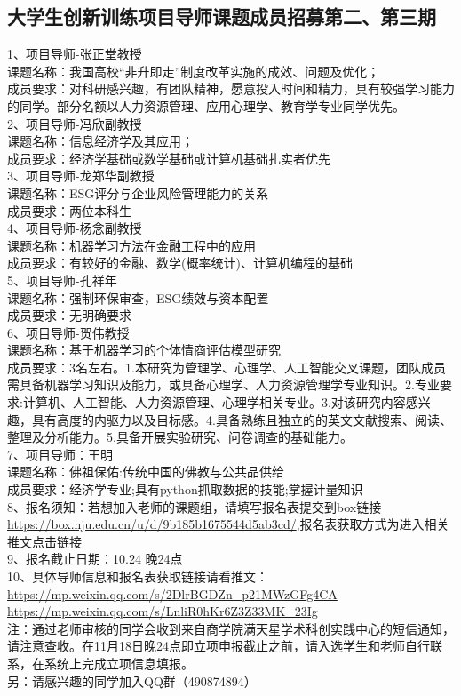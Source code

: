 \documentclass[letterpaper, 12pt]{article}
\begin{document}
\begin{multicols}{2}
\section{大学生创新训练项目导师课题成员招募第二、第三期}
1、项目导师-张正堂教授\\
   课题名称：我国高校“非升即走”制度改革实施的成效、问题及优化；\\
   成员要求：对科研感兴趣，有团队精神，愿意投入时间和精力，具有较强学习能力的同学。部分名额以人力资源管理、应用心理学、教育学专业同学优先。\\
2、项目导师-冯欣副教授\\
   课题名称：信息经济学及其应用；\\
   成员要求：经济学基础或数学基础或计算机基础扎实者优先\\
3、项目导师-龙郑华副教授\\
   课题名称：ESG评分与企业风险管理能力的关系\\
   成员要求：两位本科生\\
4、项目导师-杨念副教授\\
   课题名称：机器学习方法在金融工程中的应用\\
   成员要求：有较好的金融、数学(概率统计)、计算机编程的基础\\
5、项目导师-孔祥年\\
   课题名称：强制环保审查，ESG绩效与资本配置\\
   成员要求：无明确要求\\
6、项目导师-贺伟教授\\
   课题名称：基于机器学习的个体情商评估模型研究\\
   成员要求：3名左右。1.本研究为管理学、心理学、人工智能交叉课题，团队成员需具备机器学习知识及能力，或具备心理学、人力资源管理学专业知识。2.专业要求:计算机、人工智能、人力资源管理、心理学相关专业。3.对该研究内容感兴趣，具有高度的内驱力以及目标感。4.具备熟练且独立的的英文文献搜索、阅读、整理及分析能力。5.具备开展实验研究、问卷调查的基础能力。\\
7、项目导师：王明\\
  课题名称：佛祖保佑:传统中国的佛教与公共品供给\\
  成员要求：经济学专业;具有python抓取数据的技能;掌握计量知识\\
8、报名须知：若想加入老师的课题组，请填写报名表提交到box链接\url{https://box.nju.edu.cn/u/d/9b185b1675544d5ab3cd/},报名表获取方式为进入相关推文点击链接\\
9、报名截止日期：10.24 晚24点\\
10、具体导师信息和报名表获取链接请看推文：\url{https://mp.weixin.qq.com/s/2DlrBGDZn_p21MWzGFg4CA}\\
\url{https://mp.weixin.qq.com/s/LnliR0hKr6Z3Z33MK_23Ig}\\
注：通过老师审核的同学会收到来自商学院满天星学术科创实践中心的短信通知，请注意查收。在11月18日晚24点即立项申报截止之前，请入选学生和老师自行联系，在系统上完成立项信息填报。\\
另：请感兴趣的同学加入QQ群（490874894）\\


\end{multicols}
\end{document}
